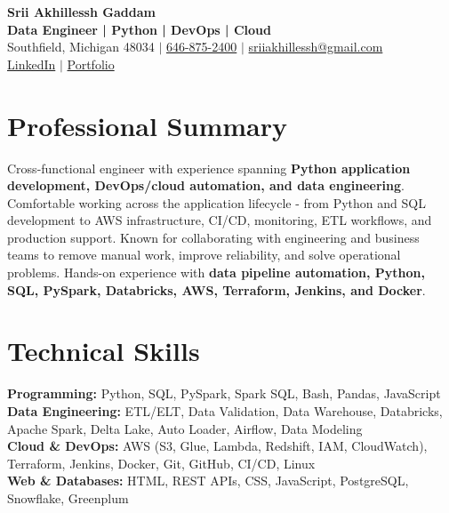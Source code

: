 \documentclass[letterpaper,10pt]{article}
\begin{document}
\fontsize{9.35pt}{10.45pt}\selectfont

\begin{center}
    {\LARGE \textbf{Srii Akhillessh Gaddam}} \\[-1pt]
    \textbf{Data Engineer | Python | DevOps | Cloud} \\[2pt]
    Southfield, Michigan 48034 $|$
    \href{tel:6468752400}{646-875-2400} $|$
    \href{mailto:sriiakhillessh@gmail.com}{sriiakhillessh@gmail.com} \\[1pt]
    \href{https://www.linkedin.com/in/srii-akhiilessh-gaddam-b48668191/}{LinkedIn} $|$
    \href{https://sriiakhillesshg.github.io/portfolio/}{Portfolio}
\end{center}
\vspace{-8pt}

\section{Professional Summary}
\small{Cross-functional engineer with experience spanning \textbf{Python application development, DevOps/cloud automation, and data engineering}. Comfortable working across the application lifecycle - from Python and SQL development to AWS infrastructure, CI/CD, monitoring, ETL workflows, and production support. Known for collaborating with engineering and business teams to remove manual work, improve reliability, and solve operational problems. Hands-on experience with \textbf{data pipeline automation, Python, SQL, PySpark, Databricks, AWS, Terraform, Jenkins, and Docker}.}

\section{Technical Skills}
\small{
\textbf{Programming:} Python, SQL, PySpark, Spark SQL, Bash, Pandas, JavaScript \\
\textbf{Data Engineering:} ETL/ELT, Data Validation, Data Warehouse, Databricks, Apache Spark, Delta Lake, Auto Loader, Airflow, Data Modeling \\
\textbf{Cloud \& DevOps:} AWS (S3, Glue, Lambda, Redshift, IAM, CloudWatch), Terraform, Jenkins, Docker, Git, GitHub, CI/CD, Linux \\
\textbf{Web \& Databases:} HTML, REST APIs, CSS, JavaScript, PostgreSQL, Snowflake, Greenplum
}
\end{document}
